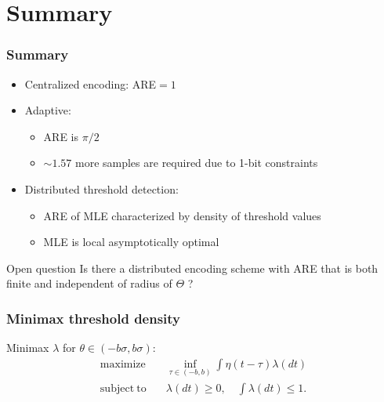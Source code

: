 \documentclass[mathserif]{beamer}
\begin{document}
\section{Summary}

\begin{frame}
\frametitle{Summary}
\begin{itemize}
\pause
\item Centralized encoding: ARE$=1$
\pause
\item Adaptive:
\begin{itemize}
\item ARE is $\pi/2$ %
\pause
\item $\sim 1.57$ more samples are required due to 1-bit constraints
\end{itemize}
\pause
\bigskip
\item Distributed threshold detection:
\begin{itemize}
\item ARE of MLE characterized by density of threshold values 
\pause
\item MLE is local asymptotically optimal 
\pause
\end{itemize}
\end{itemize}

\bigskip
\pause
\begin{alertblock}{Open question}
Is there a distributed encoding scheme with ARE that is both finite and independent of radius of $\Theta$ ?
\end{alertblock}

\end{frame}


\begin{frame}[noframenumbering]
\frametitle{Minimax threshold density}

Minimax $\lambda$ for $\theta \in (-b\sigma,b\sigma)$:
\begin{align*}
\mathrm{maximize} \quad &  \inf_{\tau \in (-b,b)} \int \eta(t-\tau) \lambda(dt)
\\ \nonumber
\mathrm{subject~to} 
\quad & \lambda(dt)\geq 0,\quad \int \lambda(dt) \leq 1. 
\end{align*}

\end{frame}
\end{document}
